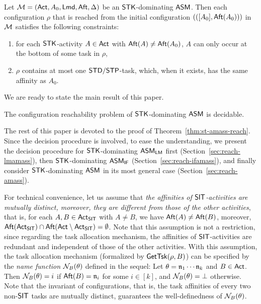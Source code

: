 \begin{proposition}\label{prop-stk}
    Let ${\mathcal{M} }=({\sf Act},A_0,{\sf Lmd},{\sf Aft},\Delta)$ be an $\mathsf{STK}$-dominating $\textsf{ASM}$. Then each configuration $\rho$ that is reached from the initial configuration $(([A_0],{\sf Aft}(A_0)))$ in ${\mathcal{M} }$ satisfies the following constraints:
    \begin{enumerate}
        \item for each $\mathsf{STK}$-activity $A\in{\sf Act}$ with ${\sf Aft}(A)\neq{\sf Aft}(A_0)$, $A$ can only occur at the bottom of some task in $\rho$, 
        \item $\rho$ contains at most one ${\sf STD}/{\sf STP}$-task, which, when it exists, has the same affinity as $A_0$.
    \end{enumerate}
\end{proposition}

We are ready to state the main result of this paper. 

\begin{theorem}\label{thm:st-amass-reach}
The configuration reachability problem of $\mathsf{STK}$-dominating $\textsf{ASM}$ is decidable.
\end{theorem}

The rest of this paper is devoted to the proof of Theorem~\ref{thm:st-amass-reach}. Since the decision procedure is involved, to ease the understanding, we present the decision procedure for ${\sf STK}$-dominating $\textsf{ASM}_\textsf{LM}$ first (Section~\ref{sec:reach-lmamass}), then ${\sf STK}$-dominating $\textsf{ASM}_\textsf{IF}$ (Section~\ref{sec:reach-ifamass}), and finally consider ${\sf STK}$-dominating $\textsf{ASM}$ in its most general case (Section~\ref{sec:reach-amass}). 

For technical convenience, let us assume that \emph{the affinities of ${\sf SIT}$-activities are mutually distinct, moreover, they are different from those of the other activities}, that is, for each $A, B \in {\sf Act}_{\sf SIT}$ with $A \neq B$, we have ${\sf Aft}(A) \neq {\sf Aft}(B)$, moreover, ${\sf Aft}({\sf Act}_{\sf SIT}) \cap {\sf Aft}({\sf Act} \setminus {\sf Act}_{\sf SIT}) = \emptyset$. Note that this assumption is not a restriction, since regarding the task allocation mechanism, the affinities of ${\sf SIT}$-activities are redundant and independent of those of the other activities. With this assumption, the task allocation mechanism (formalized by $\mathsf{GetTsk}(\rho, B)$) can be specified by the \emph{name function} $\mathcal{N}_B(\theta)$ defined in the sequel:  Let $\theta = \mathfrak{n}_1 \cdots \mathfrak{n}_k$ and $B \in {\sf Act}$. Then $\mathcal{N}_B(\theta) = i$ if ${\sf Aft}(B) = \mathfrak{n}_i$ for some $i \in [k]$, and $\mathcal{N}_B(\theta) = \bot$ otherwise. Note that the invariant of configurations, that is, the task affinities of every two non-${\sf SIT}$ tasks are mutually distinct, guarantees the well-definedness of $\mathcal{N}_B(\theta)$.

